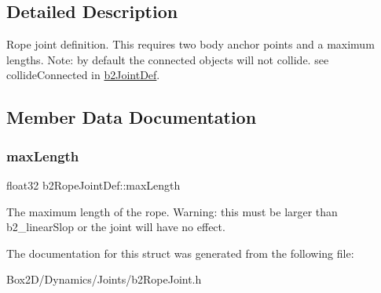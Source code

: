 \subsection{Detailed Description}
Rope joint definition. This requires two body anchor points and a maximum lengths. Note\+: by default the connected objects will not collide. see collide\+Connected in \hyperlink{structb2_joint_def}{b2\+Joint\+Def}. 

\subsection{Member Data Documentation}
\mbox{\label{structb2_rope_joint_def_a6efdcae22e2bdcfc3aae62da1a5f0d69}} 
\subsubsection{\texorpdfstring{max\+Length}{maxLength}}
{\footnotesize\ttfamily float32 b2\+Rope\+Joint\+Def\+::max\+Length}

The maximum length of the rope. Warning\+: this must be larger than b2\+\_\+linear\+Slop or the joint will have no effect. 

The documentation for this struct was generated from the following file\+:\begin{DoxyCompactItemize}
\item 
Box2\+D/\+Dynamics/\+Joints/b2\+Rope\+Joint.\+h\end{DoxyCompactItemize}
